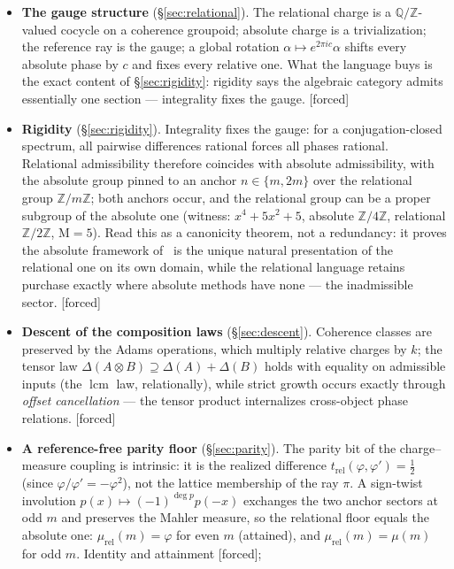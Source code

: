 \documentclass[11pt]{article}
\theoremstyle{plain}
\theoremstyle{definition}
\theoremstyle{remark}
\newcommand{\Q}{\mathbb{Q}}
\newcommand{\Z}{\mathbb{Z}}
\newcommand{\Mah}{\mathrm{M}}
\DeclareMathOperator{\lcm}{lcm}
\newcommand{\tors}{\Q/\Z}
\newcommand{\F}{\textnormal{[forced]}}
\begin{document}
\begin{itemize}
\item \textbf{The gauge structure} (\S\ref{sec:relational}). The relational charge
  is a $\tors$-valued cocycle on a coherence groupoid; absolute charge is a
  trivialization; the reference ray is the gauge; a global rotation
  $\alpha\mapsto e^{2\pi ic}\alpha$ shifts every absolute phase by $c$ and fixes
  every relative one. What the language buys is the exact content of
  \S\ref{sec:rigidity}: rigidity says the algebraic category admits
  essentially one section --- integrality fixes the gauge. \F
\item \textbf{Rigidity} (\S\ref{sec:rigidity}). Integrality fixes the gauge: for a
  conjugation-closed spectrum, all pairwise differences rational forces all phases
  rational. Relational admissibility therefore coincides with absolute
  admissibility, with the absolute group pinned to an anchor $n\in\{m,2m\}$ over
  the relational group $\Z/m\Z$; both anchors occur, and the relational group can
  be a proper subgroup of the absolute one (witness: $x^4+5x^2+5$, absolute
  $\Z/4\Z$, relational $\Z/2\Z$, $\Mah=5$). Read this as a canonicity
  theorem, not a redundancy: it proves the absolute framework of~\cite{CMC}
  is the unique natural presentation of the relational one on its own domain,
  while the relational language retains purchase exactly where absolute
  methods have none --- the inadmissible sector. \F
\item \textbf{Descent of the composition laws} (\S\ref{sec:descent}). Coherence
  classes are preserved by the Adams operations, which multiply relative charges by
  $k$; the tensor law $\Delta(A\otimes B)\supseteq\Delta(A)+\Delta(B)$ holds with
  equality on admissible inputs (the $\lcm$ law, relationally), while strict
  growth occurs exactly through \emph{offset cancellation} --- the tensor product
  internalizes cross-object phase relations. \F
\item \textbf{A reference-free parity floor} (\S\ref{sec:parity}). The parity bit
  of the charge--measure coupling is intrinsic: it is the realized difference
  $t_{\mathrm{rel}}(\varphi,\varphi')=\tfrac12$ (since $\varphi/\varphi'=
  -\varphi^2$), not the lattice membership of the ray $\pi$. A sign-twist
  involution $p(x)\mapsto(-1)^{\deg p}p(-x)$ exchanges the two anchor sectors at
  odd $m$ and preserves the Mahler measure, so the relational floor equals the
  absolute one: $\mu_{\mathrm{rel}}(m)=\varphi$ for even $m$ (attained), and
  $\mu_{\mathrm{rel}}(m)=\mu(m)$ for odd $m$. Identity and attainment \F;

\end{itemize}
\end{document}
